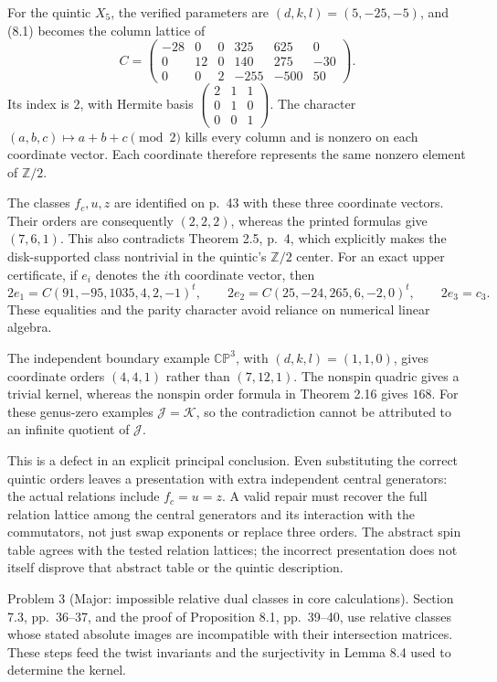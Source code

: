 \documentclass[10pt]{article}
\begin{document}
For the quintic \(X_5\), the verified parameters are \((d,k,l)=(5,-25,-5)\), and (8.1) becomes the column lattice of \[C=\begin{pmatrix}
 -28&0&0&325&625&0\\
 0&12&0&140&275&-30\\
 0&0&2&-255&-500&50
 \end{pmatrix}.\] Its index is \(2\), with Hermite basis \(\left(\begin{smallmatrix}2&1&1\\0&1&0\\0&0&1\end{smallmatrix}\right)\). The character \((a,b,c)\mapsto a+b+c\pmod2\) kills every column and is nonzero on each coordinate vector. Each coordinate therefore represents the same nonzero element of \(\mathbb Z/2\).\par
The classes \(f_c,u,z\) are identified on p. 43 with these three coordinate vectors. Their orders are consequently \((2,2,2)\), whereas the printed formulas give \((7,6,1)\). This also contradicts Theorem 2.5, p. 4, which explicitly makes the disk-supported class nontrivial in the quintic’s \(\mathbb Z/2\) center. For an exact upper certificate, if \(e_i\) denotes the \(i\)th coordinate vector, then \[2e_1=C(91,-95,1035,4,2,-1)^t,\qquad
 2e_2=C(25,-24,265,6,-2,0)^t,\qquad 2e_3=c_3.\] These equalities and the parity character avoid reliance on numerical linear algebra.\par
The independent boundary example \(\mathbb {CP}^3\), with \((d,k,l)=(1,1,0)\), gives coordinate orders \((4,4,1)\) rather than \((7,12,1)\). The nonspin quadric gives a trivial kernel, whereas the nonspin order formula in Theorem 2.16 gives \(168\). For these genus-zero examples \(\mathcal J=\mathcal K\), so the contradiction cannot be attributed to an infinite quotient of \(\mathcal J\).\par
This is a defect in an explicit principal conclusion. Even substituting the correct quintic orders leaves a presentation with extra independent central generators: the actual relations include \(f_c=u=z\). A valid repair must recover the full relation lattice among the central generators and its interaction with the commutators, not just swap exponents or replace three orders. The abstract spin table agrees with the tested relation lattices; the incorrect presentation does not itself disprove that abstract table or the quintic description.\par
Problem 3 (Major: impossible relative dual classes in core calculations).  Section 7.3, pp. 36–37, and the proof of Proposition 8.1, pp. 39–40, use relative classes whose stated absolute images are incompatible with their intersection matrices. These steps feed the twist invariants and the surjectivity in Lemma 8.4 used to determine the kernel.\par
\end{document}
